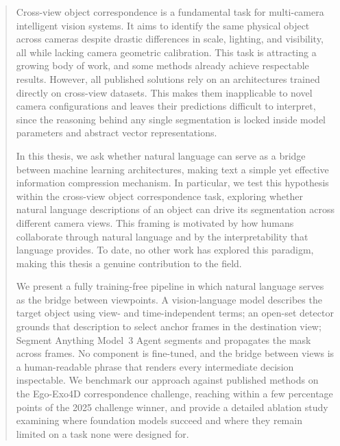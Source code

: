 \begin{abstract}
Cross-view object correspondence is a fundamental task for multi-camera intelligent vision systems. It aims to identify the same physical object across cameras despite drastic differences in scale, lighting, and visibility, all while lacking camera geometric calibration. This task is attracting a growing body of work, and some methods already achieve respectable results. However, all published solutions rely on an architectures trained directly on cross-view datasets. This makes them inapplicable to novel camera configurations and leaves their predictions difficult to interpret, since the reasoning behind any single segmentation is locked inside model parameters and abstract vector representations. 

In this thesis, we ask whether natural language can serve as a bridge between machine learning architectures, making text a simple yet effective information compression mechanism. In particular, we test this hypothesis within the cross-view object correspondence task, exploring whether natural language descriptions of an object can drive its segmentation across different camera views. This framing is motivated by how humans collaborate through natural language and by the interpretability that language provides. To date, no other work has explored this paradigm, making this thesis a genuine contribution to the field.   

We present a fully training-free pipeline in which natural language serves as the bridge between viewpoints. A vision-language model describes the target object using view- and time-independent terms; an open-set detector grounds that description to select anchor frames in the destination view; Segment Anything Model~3 Agent segments and propagates the mask across frames. No component is fine-tuned, and the bridge between views is a human-readable phrase that renders every intermediate decision inspectable. We benchmark our approach against published methods on the Ego-Exo4D correspondence challenge, reaching within a few percentage points of the 2025 challenge winner, and provide a detailed ablation study examining where foundation models succeed and where they remain limited on a task none were designed for.


\end{abstract}
